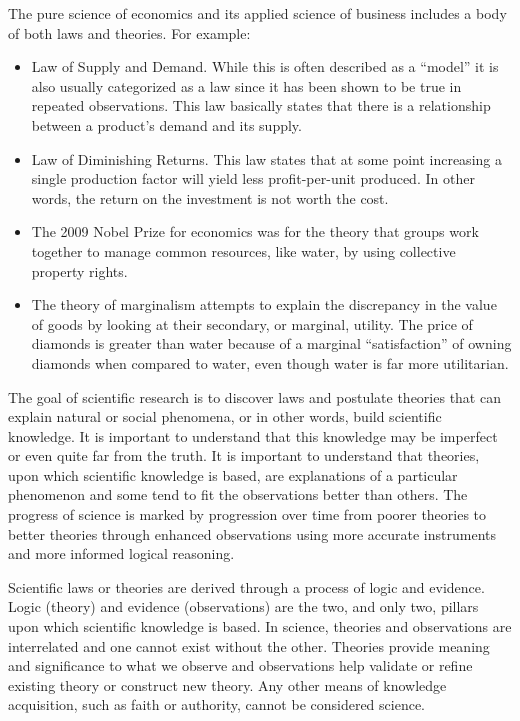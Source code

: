 The pure science of economics and its applied science of business includes a body of both laws and theories. For example:

\begin{itemize}
	\item Law of Supply and Demand. While this is often described as a ``model'' it is also usually categorized as a law since it has been shown to be true in repeated observations. This law basically states that there is a relationship between a product's demand and its supply.
	\item Law of Diminishing Returns. This law states that at some point increasing a single production factor will yield less profit-per-unit produced. In other words, the return on the investment is not worth the cost.
	\item The 2009 Nobel Prize for economics was for the theory that groups work together to manage common resources, like water, by using collective property rights.
	\item The theory of marginalism attempts to explain the discrepancy in the value of goods by looking at their secondary, or marginal, utility. The price of diamonds is greater than water because of a marginal ``satisfaction'' of owning diamonds when compared to water, even though water is far more utilitarian.  
\end{itemize}

The goal of scientific research is to discover laws and postulate theories that can explain natural or social phenomena, or in other words, build scientific knowledge. It is important to understand that this knowledge may be imperfect or even quite far from the truth. It is important to understand that theories, upon which scientific knowledge is based, are explanations of a particular phenomenon and some tend to fit the observations better than others. The progress of science is marked by progression over time from poorer theories to better theories through enhanced observations using more accurate instruments and more informed logical reasoning.

Scientific laws or theories are derived through a process of logic and evidence. Logic (theory) and evidence (observations) are the two, and only two, pillars upon which scientific knowledge is based. In science, theories and observations are interrelated and one cannot exist without the other. Theories provide meaning and significance to what we observe and observations help validate or refine existing theory or construct new theory. Any other means of knowledge acquisition, such as faith or authority, cannot be considered science.

